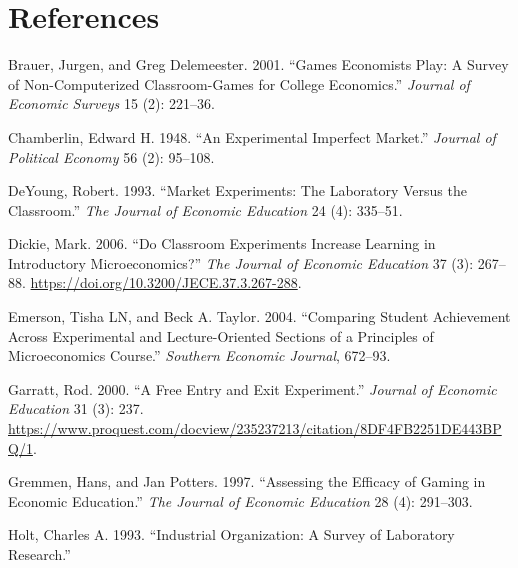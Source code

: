 \documentclass[
]{article}
\newlength{\cslhangindent}
\newlength{\cslentryspacingunit} %
\newenvironment{CSLReferences}[2] %
 {%
  \setlength{\parindent}{0pt}
  \ifodd #1
  \let\oldpar\par
  \def\par{\hangindent=\cslhangindent\oldpar}
  \fi
  \setlength{\parskip}{#2\cslentryspacingunit}
 }%
 {}
\begin{document}
\hypertarget{references}{%
\section*{References}\label{references}}

\hypertarget{refs}{}
\begin{CSLReferences}{1}{0}
\leavevmode{}%
Brauer, Jurgen, and Greg Delemeester. 2001. {``Games Economists Play:
{A} Survey of Non-Computerized Classroom-Games for College Economics.''}
\emph{Journal of Economic Surveys} 15 (2): 221--36.

\leavevmode{}%
Chamberlin, Edward H. 1948. {``An Experimental Imperfect Market.''}
\emph{Journal of Political Economy} 56 (2): 95--108.

\leavevmode{}%
DeYoung, Robert. 1993. {``Market Experiments: {The} Laboratory Versus
the Classroom.''} \emph{The Journal of Economic Education} 24 (4):
335--51.

\leavevmode{}%
Dickie, Mark. 2006. {``Do {Classroom} {Experiments} {Increase}
{Learning} in {Introductory} {Microeconomics}?''} \emph{The Journal of
Economic Education} 37 (3): 267--88.
\url{https://doi.org/10.3200/JECE.37.3.267-288}.

\leavevmode{}%
Emerson, Tisha LN, and Beck A. Taylor. 2004. {``Comparing Student
Achievement Across Experimental and Lecture-Oriented Sections of a
Principles of Microeconomics Course.''} \emph{Southern Economic
Journal}, 672--93.

\leavevmode{}%
Garratt, Rod. 2000. {``A Free Entry and Exit Experiment.''}
\emph{Journal of Economic Education} 31 (3): 237.
\url{https://www.proquest.com/docview/235237213/citation/8DF4FB2251DE443BPQ/1}.

\leavevmode{}%
Gremmen, Hans, and Jan Potters. 1997. {``Assessing the Efficacy of
Gaming in Economic Education.''} \emph{The Journal of Economic
Education} 28 (4): 291--303.

\leavevmode{}%
Holt, Charles A. 1993. {``Industrial {Organization}: {A} {Survey} of
{Laboratory} {Research}.''}


\end{CSLReferences}
\end{document}
